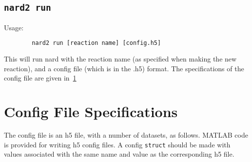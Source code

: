 \documentclass[11pt]{article}
\begin{document}
    \subsection[\texttt{nard2 run}]{\texttt{nard2 run}}
    Usage:
    \begin{lstlisting}
        nard2 run [reaction name] [config.h5]
    \end{lstlisting}
    This will run nard with the reaction name (as specified when making the new reaction), and a config file (which is in the .h5) format.
    The specifications of the config file are given in~\ref{sec:config_file}

    \section[Config File Specifications]{Config File Specifications}
    \label{sec:config_file}
    The config file is an h5 file, with a number of datasets, as follows.
    MATLAB code is provided for writing h5 config files. A config \texttt{struct} should be made with values associated with the same name and value as the corresponding h5 file.
\end{document}
